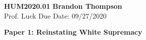 \noindent
\textbf{HUM2020.01} \hfill \textbf{Brandon Thompson} \\
\normalsize Prof. Luck \hfill Due Date: 09/27/2020 \\

\begin{center}
\textbf{Paper 1: Reinstating White Supremacy}
\end{center}

